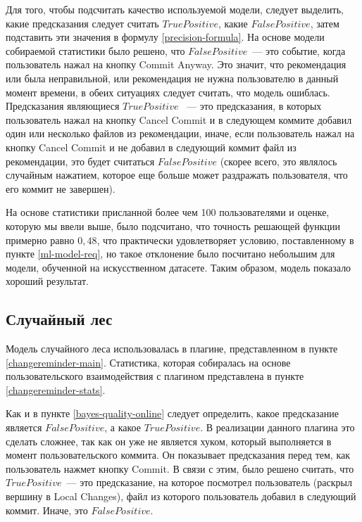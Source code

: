 Для того, чтобы подсчитать качество используемой модели, следует выделить, какие предсказания следует считать $TruePositive$, какие $FalsePositive$, затем подставить эти значения в формулу \ref{precision-formula}. На основе модели собираемой статистики было решено, что $FalsePositive$~--- это событие, когда пользователь нажал на кнопку Commit Anyway. Это значит, что рекомендация или была неправильной, или рекомендация не нужна пользователю в данный момент времени, в обеих ситуациях следует считать, что модель ошиблась. Предсказания являющиеся $TruePositive$ ~--- это предсказания, в которых пользователь нажал на кнопку Cancel Commit и в следующем коммите добавил один или несколько файлов из рекомендации, иначе, если пользователь нажал на кнопку Cancel Commit и не добавил в следующий коммит файл из рекомендации, это будет считаться $FalsePositive$ (скорее всего, это являлось случайным нажатием, которое еще больше может раздражать пользователя, что его коммит не завершен).

На основе статистики присланной более чем 100 пользователями и оценке, которую мы ввели выше, было подсчитано, что точность решающей функции примерно равно $0,48$, что практически удовлетворяет условию, поставленному в пункте \ref{ml-model-req}, но такое отклонение было посчитано небольшим для модели, обученной на искусственном датасете. Таким образом, модель показало хороший результат.
    \subsection{Случайный лес}\label{forest-quality-online}
Модель случайного леса использовалась в плагине, представленном в пункте \ref{changereminder-main}. Статистика, которая собиралась на основе пользовательского взаимодействия с плагином представлена в пункте \ref{changereminder-stats}.

Как и в пункте \ref{bayes-quality-online} следует определить, какое предсказание является $FalsePositive$, а какое $TruePositive$. В реализации данного плагина это сделать сложнее, так как он уже не является хуком, который выполняется в момент пользовательского коммита. Он показывает предсказания перед тем, как пользователь нажмет кнопку Commit. В связи с этим, было решено считать, что $TruePositive$~--- это предсказание, на которое посмотрел пользователь (раскрыл вершину в Local Changes), файл из которого пользователь добавил в следующий коммит. Иначе, это $FalsePositive$. 

